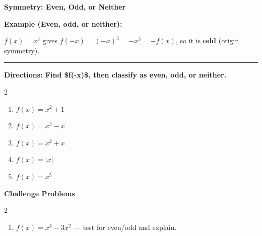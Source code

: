 \documentclass[12pt]{article}
\begin{document}
\vspace{0.35cm}

\begin{center}{\Large \textbf{Symmetry: Even, Odd, or Neither}}\end{center}\vspace{0.25cm}
\textbf{Example (Even, odd, or neither):}

$f(x)=x^{3}$ gives $f(-x)=(-x)^{3}=-x^{3}=-f(x)$, so it is \textbf{odd} (origin symmetry).

\vspace{0.3cm}\hrule\vspace{0.4cm}
\textbf{Directions: Find \$f(-x)\$, then classify as even, odd, or neither.}

\begin{multicols}{2}
\begin{enumerate}[label=\textbf{\arabic*.}, start=1, itemsep=2cm]
  \item $\displaystyle f(x)=x^{2}+1$
  \item $\displaystyle f(x)=x^{3}-x$
  \item $\displaystyle f(x)=x^{2}+x$
  \item $\displaystyle f(x)=|x|$
  \item $\displaystyle f(x)=x^{5}$
\end{enumerate}
\end{multicols}
\newpage

\begin{center}{\large \textbf{Challenge Problems}}\end{center}\vspace{0.3cm}
\begin{multicols}{2}\begin{enumerate}[label=\textbf{\arabic*.}, start=6, itemsep=2.6cm]
  \item $f(x)=x^4-3x^2$ — test for even/odd and explain.
\end{enumerate}\end{multicols}\newpage
\end{document}
